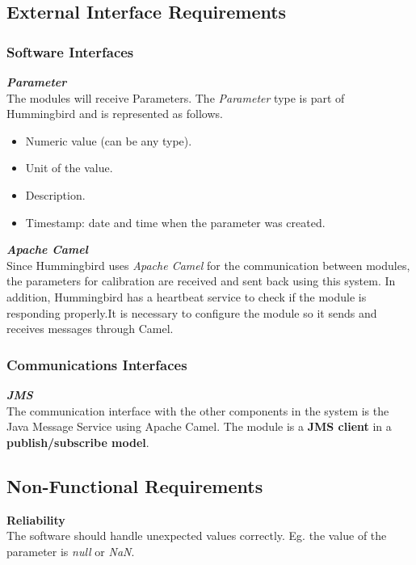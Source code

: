 \subsection{External Interface Requirements}

\subsubsection{Software Interfaces}

\textbf{\emph{Parameter}}\\
The modules will receive Parameters. The \emph{Parameter} type is part of Hummingbird and is represented as follows.

\begin{itemize}
\item Numeric value (can be any type).
\item Unit of the value.
\item Description.
\item Timestamp: date and time when the parameter was created.

\end{itemize}


\textbf{\emph{Apache Camel}}\citep{Camel}\\
Since Hummingbird uses \emph{Apache Camel} for the communication between modules, the parameters for calibration are received and sent back using this system. In addition, Hummingbird has a heartbeat service to check if the module is responding properly.It is necessary to configure the module so it sends and receives messages through Camel.


\subsubsection{Communications Interfaces}

\textbf{\emph{JMS}}\cite{JMS}\\
The communication interface with the other components in the system is the Java Message Service using Apache Camel. The module is a \textbf{JMS client} in a \textbf{publish/subscribe model}.

\subsection{Non-Functional Requirements}

\textbf{Reliability}\\
The software should handle unexpected values correctly. Eg. the value of the parameter is \emph{null} or \emph{NaN}.

